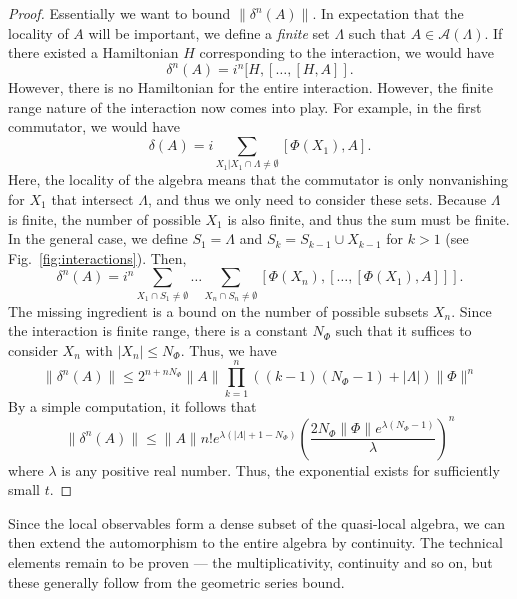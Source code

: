 \documentclass[prb,11pt, nofootinbib]{revtex4-2}
\theoremstyle{definition}
\theoremstyle{definition}
\theoremstyle{definition}
\theoremstyle{definition}
\newcommand{\note}[1]{{\color{red} {#1}}}
\renewcommand{\note}[1]{{}}
\begin{document}
\begin{proof}
	Essentially we want to bound $\|\delta^n(A)\|$. In expectation that the locality of $A$ will be important, we define a \emph{finite} set $\Lambda$ such that $A\in \mathcal{A}(\Lambda)$. If there existed a Hamiltonian $H$ corresponding to the interaction, we would have 
	\[
		\delta^n(A) = i^n [H, [\dots, [H, A]] 
	.\] 
	However, there is no Hamiltonian for the entire interaction. However, the finite range nature of the interaction now comes into play. For example, in the first commutator, we would have
	\[
		\delta(A) = i \sum_{X_1|X_1\cap \Lambda \neq \emptyset } [\Phi(X_1), A]
	.\] 
	Here, the locality of the algebra means that the commutator is only nonvanishing for $X_1$ that intersect $\Lambda$, and thus we only need to consider these sets. Because $\Lambda$ is finite, the number of possible $X_1$ is also finite, and thus the sum must be finite. In the general case, we define $S_1=\Lambda$ and $S_k = S_{k-1}\cup X_{k-1}$ for $k>1$ (see Fig.~\ref{fig:interactions}). Then, 
	\[
		\delta^n(A)=i^n \sum_{X_1\cap S_1 \neq \emptyset }\dots \sum_{X_n \cap S_n \neq \emptyset} [\Phi(X_n), [\dots, [\Phi(X_1), A]]]
.\] 
The missing ingredient is a bound on the number of possible subsets $X_n$. Since the interaction is finite range, there is a constant $N_\Phi$ such that it suffices to consider $X_n$ with $|X_n| \le N_\Phi$. Thus, we have
\[
\|\delta^n(A)\|\le 2^{n+nN_\Phi} \|A\|\prod_{k=1}^{n} ((k-1)(N_\Phi-1)+|\Lambda|)\|\Phi\|^n 
\] 
By a simple computation, it follows that\note{ To prove that first estimate, first note that $\|[A,B]\| \le 2 \|A\| \|B\|$. Then, pick a point in $S_n$, of which there are $|S_n|$ many. Then the size of the $N_\Phi$ ball around this point is bounded, leading to the constant $C_\Phi$.}
\[
	\|\delta^n(A)\|\le \|A\|n! e^{\lambda(|\Lambda|+1-N_\Phi)}\left( \frac{2N_\Phi\|\Phi\|e^{\lambda(N_\Phi-1)}}{\lambda} \right)^n
\] 
where $\lambda$ is any positive real number. Thus, the exponential exists for sufficiently small $t$.\note{ We use the inequality $a^n \le n! \lambda^{-n}\exp(a\lambda)$ with $a=(n-1)(N_\Phi-1)+|\Lambda|$}
\end{proof}
Since the local observables form a dense subset of the quasi-local algebra, we can then extend the automorphism to the entire algebra by continuity. The technical elements remain to be proven --- the multiplicativity, continuity and so on, but these generally follow from the geometric series bound.
\end{document}
